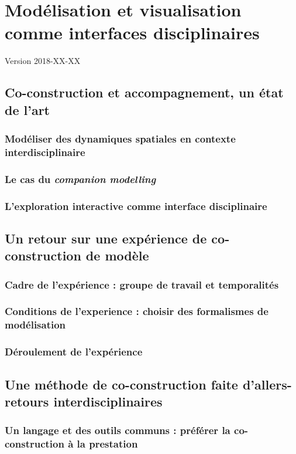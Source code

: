 \chapter{Modélisation et visualisation comme interfaces disciplinaires}
\begin{center}
	{\large Version 2018-XX-XX}	\end{center}

\section{Co-construction et accompagnement, un état de l'art}
\subsection{Modéliser des dynamiques spatiales en contexte interdisciplinaire}
\subsection{Le cas du \textit{companion modelling}}
\subsection{L'exploration interactive comme interface disciplinaire}

\section{Un retour sur une expérience de co-construction de modèle}
\subsection{Cadre de l'expérience : groupe de travail et temporalités}
\subsection{Conditions de l'experience : choisir des formalismes de modélisation}
\subsection{Déroulement de l'expérience}

\section{Une méthode de co-construction faite d'allers-retours interdisciplinaires}
\subsection{Un langage et des outils communs : préférer la co-construction à la prestation}
